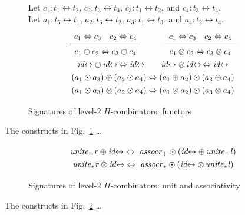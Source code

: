 \documentclass{article}
\newcommand{\identlp}{\mathit{unite}_+\mathit{l}}
\newcommand{\identlsp}{\mathit{unite}_+\mathit{r}}
\newcommand{\assocrp}{\mathit{assocr}_+}
\newcommand{\identlt}{\mathit{unite}_*\mathit{l}}
\newcommand{\identlst}{\mathit{unite}_*\mathit{r}}
\newcommand{\assocrt}{\mathit{assocr}_*}
\newcommand{\idc}{\mathit{id}\!\!\leftrightarrow}
\newcommand{\Rule}[4]{
\makebox{{\rm #1}
$\displaystyle
\frac{\begin{array}{l}#2 \\\end{array}}
{\begin{array}{l}#3      \\\end{array}}$
 #4}}
\begin{document}
\begin{figure}[tb]
Let $c_1 : t_1 \leftrightarrow t_2$, $c_2 : t_3 \leftrightarrow t_4$, $c_3 : t_1 \leftrightarrow t_2$, and $c_4 : t_3 \leftrightarrow t_4$. \\
Let $a_1 : t_5 \leftrightarrow t_1$,  $a_2 : t_6 \leftrightarrow t_2$, $a_3 : t_1 \leftrightarrow t_3$, and $a_4 : t_2 \leftrightarrow t_4$.
\[\def\arraystretch{1.3}
\begin{array}{c}
\Rule{}
  {c_1 \Leftrightarrow c_3 \quad c_2 \Leftrightarrow c_4}
  {c_1 \oplus c_2 \Leftrightarrow c_3 \oplus c_4}
  {}
\qquad
\Rule{}
  {c_1 \Leftrightarrow c_3 \quad c_2 \Leftrightarrow c_4}
  {c_1 \otimes c_2 \Leftrightarrow c_3 \otimes c_4}
  {}
\\
  {\idc \oplus \, \idc \, \Leftrightarrow \idc}
\qquad
  {\idc \otimes \, \idc \, \Leftrightarrow \idc}
\\
  {(a_1 \odot a_3) \oplus (a_2 \odot a_4) \Leftrightarrow (a_1 \oplus a_2) \odot (a_3 \oplus a_4)}
\\
  {(a_1 \odot a_3) \otimes (a_2 \odot a_4) \Leftrightarrow (a_1 \otimes a_2) \odot (a_3 \otimes a_4)}
\end{array}\]
\caption{\label{fige}Signatures of level-2 $\Pi$-combinators: functors}
\end{figure}

The constructs in Fig.~\ref{fige} \ldots
\begin{center}
\begin{tikzpicture}[scale=0.7,every node/.style={scale=0.8}]
\end{tikzpicture}
\end{center}

\begin{figure}[tb]
\[\def\arraystretch{1.3}
\begin{array}{c}
  {\identlsp \oplus \idc ~\Leftrightarrow~ \assocrp \odot (\idc \oplus \, \identlp)}
\\
  {\identlst \otimes \idc ~\Leftrightarrow~ \assocrt \odot (\idc \otimes \, \identlt)}
\end{array}\]
\caption{\label{figd}Signatures of level-2 $\Pi$-combinators: unit and associativity}
\end{figure}

The constructs in Fig.~\ref{figd} \ldots
\begin{center}
\begin{tikzpicture}[scale=0.7,every node/.style={scale=0.8}]
\end{tikzpicture}
\end{center}
\end{document}

